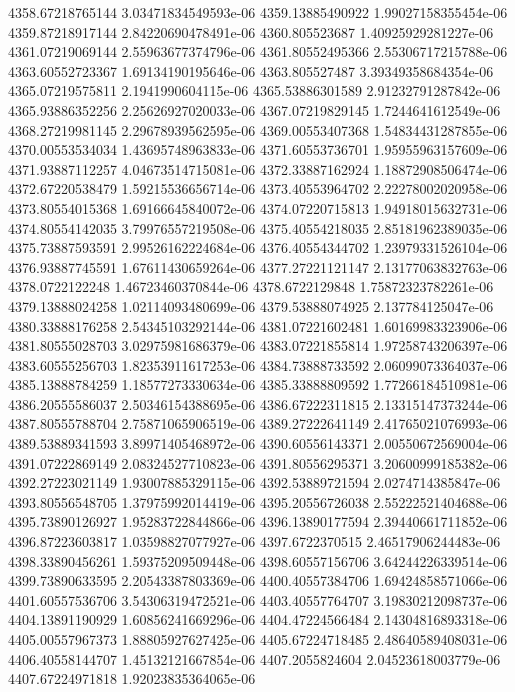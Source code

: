 {4358.67218765144 3.03471834549593e-06
4359.13885490922 1.99027158355454e-06
4359.87218917144 2.84220690478491e-06
4360.805523687 1.40925929281227e-06
4361.07219069144 2.55963677374796e-06
4361.80552495366 2.55306717215788e-06
4363.60552723367 1.69134190195646e-06
4363.805527487 3.39349358684354e-06
4365.07219575811 2.1941990604115e-06
4365.53886301589 2.91232791287842e-06
4365.93886352256 2.25626927020033e-06
4367.07219829145 1.7244641612549e-06
4368.27219981145 2.29678939562595e-06
4369.00553407368 1.54834431287855e-06
4370.00553534034 1.43695748963833e-06
4371.60553736701 1.95955963157609e-06
4371.93887112257 4.04673514715081e-06
4372.33887162924 1.18872908506474e-06
4372.67220538479 1.59215536656714e-06
4373.40553964702 2.22278002020958e-06
4373.80554015368 1.69166645840072e-06
4374.07220715813 1.94918015632731e-06
4374.80554142035 3.79976557219508e-06
4375.40554218035 2.85181962389035e-06
4375.73887593591 2.99526162224684e-06
4376.40554344702 1.23979331526104e-06
4376.93887745591 1.67611430659264e-06
4377.27221121147 2.13177063832763e-06
4378.0722122248 1.46723460370844e-06
4378.6722129848 1.75872323782261e-06
4379.13888024258 1.02114093480699e-06
4379.53888074925 2.137784125047e-06
4380.33888176258 2.54345103292144e-06
4381.07221602481 1.60169983323906e-06
4381.80555028703 3.02975981686379e-06
4383.07221855814 1.97258743206397e-06
4383.60555256703 1.82353911617253e-06
4384.73888733592 2.06099073364037e-06
4385.13888784259 1.18577273330634e-06
4385.33888809592 1.77266184510981e-06
4386.20555586037 2.50346154388695e-06
4386.67222311815 2.13315147373244e-06
4387.80555788704 2.75871065906519e-06
4389.27222641149 2.41765021076993e-06
4389.53889341593 3.89971405468972e-06
4390.60556143371 2.00550672569004e-06
4391.07222869149 2.08324527710823e-06
4391.80556295371 3.20600999185382e-06
4392.27223021149 1.93007885329115e-06
4392.53889721594 2.0274714385847e-06
4393.80556548705 1.37975992014419e-06
4395.20556726038 2.55222521404688e-06
4395.73890126927 1.95283722844866e-06
4396.13890177594 2.39440661711852e-06
4396.87223603817 1.03598827077927e-06
4397.6722370515 2.46517906244483e-06
4398.33890456261 1.59375209509448e-06
4398.60557156706 3.64244226339514e-06
4399.73890633595 2.20543387803369e-06
4400.40557384706 1.69424858571066e-06
4401.60557536706 3.54306319472521e-06
4403.40557764707 3.19830212098737e-06
4404.13891190929 1.60856241669296e-06
4404.47224566484 2.14304816893318e-06
4405.00557967373 1.88805927627425e-06
4405.67224718485 2.48640589408031e-06
4406.40558144707 1.45132121667854e-06
4407.2055824604 2.04523618003779e-06
4407.67224971818 1.92023835364065e-06
}
